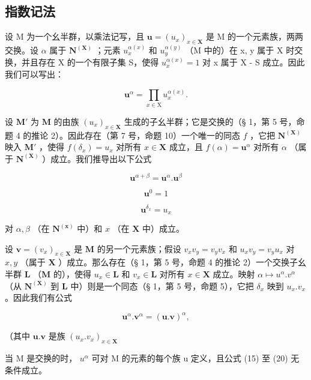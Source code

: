 \subsection{指数记法}

设 M 为一个幺半群，以乘法记写，且 \(\mathbf{u} = (u_{x})_{x \in \mathbf{X}}\) 是 M 的一个元素族，两两交换。设 \(\alpha\) 属于 \(\mathbf{N}^{(\mathbf{X})}\) ；元素 \(u_{x}^{\alpha(x)}\) 和 \(u_{y}^{\alpha(y)}\) （M 中的）在 x, y 属于 X 时交换，并且存在 X 的一个有限子集 S，使得 \(u_{x}^{\alpha(x)} = 1\) 对 x 属于 X - S 成立。因此我们可以写出：

\[
\mathbf {u} ^ {\alpha} = \prod_ {x \in \mathrm{X}} u _ {x} ^ {\alpha (x)}.\tag{16}
\]

设 \(\mathbf{M}'\) 为 \(\mathbf{M}\) 的由族 \((u_x)_{x\in \mathbf{X}}\) 生成的子幺半群；它是交换的（§ 1，第 5 号，命题 4 的推论 2）。因此存在（第 7 号，命题 10）一个唯一的同态 \(f\) ，它把 \(\mathbf{N}^{(\mathbf{X})}\) 映入 \(\mathbf{M}'\) ，使得 \(f(\delta_x) = u_x\) 对所有 \(x\in \mathbf{X}\) 成立，且 \(f(\alpha) = \mathbf{u}^{\alpha}\) 对所有 \(\alpha\) （属于 \(\mathbf{N}^{(\mathbf{X})}\) ）成立。我们推导出以下公式

\[
\mathbf {u} ^ {\alpha + \beta} = \mathbf {u} ^ {\alpha}. \mathbf {u} ^ {\beta}\tag{17}
\]

\[
\mathbf {u} ^ {0} = 1\tag{18}
\]

\[
\mathbf {u} ^ {\delta_ {x}} = u _ {x}\tag{19}
\]

对 \(\alpha, \beta\) （在 \(\mathbf{N}^{(\mathbf{x})}\) 中）和 \(x\) （在 \(\mathbf{X}\) 中）成立。

设 \(\mathbf{v} = (v_x)_{x \in \mathbf{X}}\) 是 \(\mathbf{M}\) 的另一个元素族；假设 \(v_x v_y = v_y v_x\) 和 \(u_x v_y = v_y u_x\) 对 \(x, y\) （属于 \(\mathbf{X}\) ）成立。那么存在（§ 1，第 5 号，命题 4 的推论 2）一个交换子幺半群 \(\mathbf{L}\) （\(\mathbf{M}\) 的），使得 \(u_x \in \mathbf{L}\) 和 \(v_x \in \mathbf{L}\) 对所有 \(x \in \mathbf{X}\) 成立。映射 \(\alpha \mapsto u^\alpha . v^\alpha\) （从 \(\mathbf{N}^{(\mathbf{X})}\) 到 \(\mathbf{L}\) 中）则是一个同态（§ 1，第 5 号，命题 5），它把 \(\delta_x\) 映到 \(u_x . v_x\) 。因此我们有公式

\[
\mathbf {u} ^ {\alpha}. \mathbf {v} ^ {\alpha} = (\mathbf {u}. \mathbf {v}) ^ {\alpha},\tag{20}
\]

（其中 \(\mathbf{u}.\mathbf{v}\) 是族 \((u_x.v_x)_{x\in \mathbf{X}}\)

当 M 是交换的时， \(u^{\alpha}\) 可对 M 的元素的每个族 u 定义，且公式 (15) 至 (20) 无条件成立。

